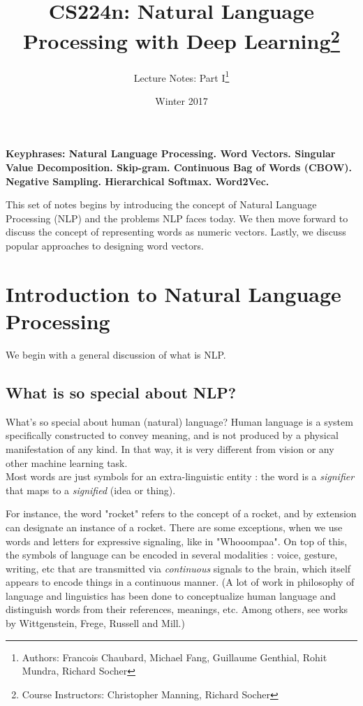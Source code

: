 \documentclass[nobib]{tufte-handout}
\title{CS224n: Natural Language Processing with Deep Learning\thanks{Course Instructors: Christopher Manning, Richard Socher}}
\author[Francois Chaubard, Rohit Mundra, Richard Socher]{Lecture Notes: Part I\thanks{Authors: Francois Chaubard, Michael Fang, Guillaume Genthial, Rohit Mundra, Richard Socher}}
\date{Winter 2017} %
\begin{document}
\maketitle%



\textbf{Keyphrases: Natural Language Processing. Word Vectors. Singular Value Decomposition. Skip-gram. Continuous Bag of Words (CBOW). Negative Sampling. Hierarchical Softmax. Word2Vec.}

This set of notes begins by introducing the concept of Natural Language Processing (NLP) and the problems NLP faces today. We then move forward to discuss the concept of representing words as numeric vectors. Lastly, we discuss popular approaches to designing word vectors.


\section{Introduction to Natural Language Processing}\label{sec:intro-nlp}

We begin with a general discussion of what is NLP.
\subsection{What is so special about NLP?}
What's so special about human (natural) language? Human language is a system specifically constructed to convey meaning, and is not produced by a physical manifestation of any kind. In that way, it is very different from vision or any other machine learning task. \\ 
	Most words are just symbols for an extra-linguistic entity : the word is a \emph{signifier} that maps to a \emph{signified} (idea or thing).

For instance, the word "rocket" refers to the concept of a rocket, and by extension can designate an instance of a rocket. There are some exceptions, when we use words and letters for expressive signaling, like in "Whooompaa". On top of this, the symbols of language can be encoded in several modalities : voice, gesture, writing, etc that are transmitted via \emph{continuous} signals to the brain, which itself appears to encode things in a continuous manner. (A lot of work in philosophy of language and linguistics has been done to conceptualize human language and distinguish words from their references, meanings, etc. Among others, see works by Wittgenstein, Frege, Russell and Mill.)
\end{document}
